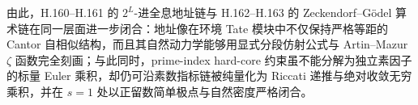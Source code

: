 \noindent
由此，H.160--H.161 的 \(2^L\)-进全息地址链与 H.162--H.163 的 Zeckendorf--Gödel 算术链在同一层面进一步闭合：地址像在环境 Tate 模块中不仅保持严格等距的 Cantor 自相似结构，而且其自然动力学能够用显式分段仿射公式与 Artin--Mazur \(\zeta\) 函数完全刻画；与此同时，prime-index hard-core 约束虽不能分解为独立素因子的标量 Euler 乘积，却仍可沿素数指标链被纯量化为 Riccati 递推与绝对收敛无穷乘积，并在 \(s=1\) 处以正留数简单极点与自然密度严格闭合。

\endinput
